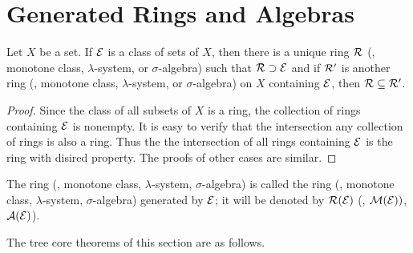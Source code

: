 \section{Generated Rings and Algebras}
\begin{prop}
\label{prop:measurable_sets:existence_of_generated_rings}
Let $X$ be a set. 
If $\mathcal{E}$ is a class of sets of $X$, then there is a unique ring 
$\mathcal{R}$ (\resp, monotone class, $\lambda$-system, or $\sigma$-algebra) 
such that $\mathcal{R} \supset \mathcal{E}$ and if $\mathcal{R}'$ is another ring (\resp, monotone 
class, $\lambda$-system, or $\sigma$-algebra) on $X$ containing $\mathcal{E}$, 
then $\mathcal{R} \subseteq \mathcal{R}'$. 
\end{prop}
\begin{proof}
Since the class of all subsets of $X$ is a ring, the collection of rings 
containing $\mathcal{E}$ is nonempty. 
It is easy to verify that the intersection any collection of rings is also 
a ring. 
Thus the the intersection of all rings containing $\mathcal{E}$ is the ring with 
disired property. 
The proofs of other cases are similar. 
\end{proof}

\begin{defn}
The ring (\resp, monotone class, $\lambda$-system, $\sigma$-algebra) is 
called the ring (\resp, monotone class, $\lambda$-system, $\sigma$-algebra) 
generated by $\mathcal{E}$; it will be denoted by $\mathcal{R}(\mathcal{E})$ (\resp, $\mathcal{M}(\mathcal{E}))$, 
$\mathcal{A}(\mathcal{E})$). 
\end{defn}

The tree core theorems of this section are as follows. 

